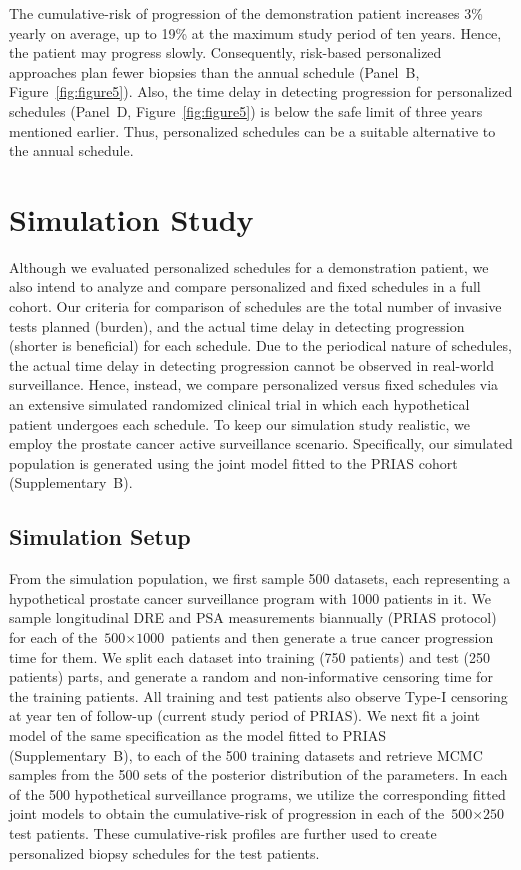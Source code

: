 \documentclass[AMA,STIX1COL]{WileyNJD-v2}
\begin{document}
The cumulative-risk of progression of the demonstration patient increases 3\% yearly on average, up to 19\% at the maximum study period of ten years. Hence, the patient may progress slowly. Consequently, risk-based personalized approaches plan fewer biopsies than the annual schedule (Panel~B, Figure~\ref{fig:figure5}). Also, the time delay in detecting progression for personalized schedules (Panel~D, Figure~\ref{fig:figure5}) is below the safe limit of three years mentioned earlier. Thus, personalized schedules can be a suitable alternative to the annual schedule.


\section{Simulation Study}
\label{sec:sim_study}
Although we evaluated personalized schedules for a demonstration patient, we also intend to analyze and compare personalized and fixed schedules in a full cohort. Our criteria for comparison of schedules are the total number of invasive tests planned (burden), and the actual time delay in detecting progression (shorter is beneficial) for each schedule. Due to the periodical nature of schedules, the actual time delay in detecting progression cannot be observed in real-world surveillance. Hence, instead, we compare personalized versus fixed schedules via an extensive simulated randomized clinical trial in which each hypothetical patient undergoes each schedule. To keep our simulation study realistic, we employ the prostate cancer active surveillance scenario. Specifically, our simulated population is generated using the joint model fitted to the PRIAS cohort (Supplementary~B).

\subsection{Simulation Setup}
From the simulation population, we first sample 500 datasets, each representing a hypothetical prostate cancer surveillance program with 1000 patients in it. We sample longitudinal DRE and PSA measurements biannually (PRIAS protocol) for each of the  ${\mbox{500} \times \mbox{1000}}$ patients and then generate a true cancer progression time for them. We split each dataset into training (750 patients) and test (250 patients) parts, and generate a random and non-informative censoring time for the training patients. All training and test patients also observe Type-I censoring at year ten of follow-up (current study period of PRIAS). We next fit a joint model of the same specification as the model fitted to PRIAS (Supplementary~B), to each of the 500 training datasets and retrieve MCMC samples from the 500 sets of the posterior distribution of the parameters. In each of the 500 hypothetical surveillance programs, we utilize the corresponding fitted joint models to obtain the cumulative-risk of progression in each of the ${\mbox{500} \times \mbox{250}}$ test patients. These cumulative-risk profiles are further used to create personalized biopsy schedules for the test patients. 
\end{document}
